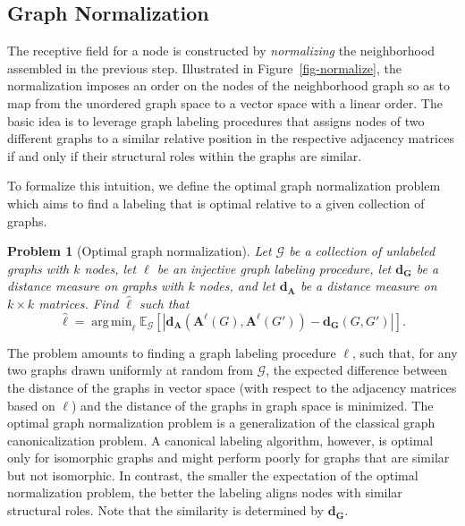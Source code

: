 \documentclass{article}
\DeclareMathOperator*{\argmin}{arg\,min}
\newtheorem{problem}{Problem}
\begin{document}
\subsection{Graph Normalization}

The receptive field for a node is constructed by \emph{normalizing} the neighborhood assembled in the previous step. Illustrated in Figure~\ref{fig-normalize}, the normalization imposes an order on the nodes of the neighborhood graph so as to map from the unordered graph space to a vector space with a linear order. The basic idea is to leverage graph labeling procedures that assigns nodes of two different graphs to a similar relative position in the respective adjacency matrices if and only if their structural roles within the graphs are similar.



To formalize this intuition, we define the optimal graph normalization problem which aims to find a labeling that is optimal relative to a given collection of graphs. 


\begin{problem}[Optimal graph normalization]
Let $\mathcal{G}$ be a collection of unlabeled graphs with $k$ nodes, let $\ell$ be an injective graph labeling procedure, let $\mathbf{d}_{\mathbf{G}}$ be a distance measure on graphs with $k$ nodes, and let $\mathbf{d}_{\mathbf{A}}$ be a distance measure on $k\times k$ matrices. Find $\hat{\ell}$ such that
$$ \label{equation-graph-normalization}
\hat{\ell} = \argmin_{\ell} \mathbb{E}_{\mathcal{G}}\left[\left|\mathbf{d}_{\mathbf{A}}\left(\mathbf{A}^{\ell}(G), \mathbf{A}^{\ell}(G')\right) - \mathbf{d}_{\mathbf{G}}(G, G')\right|\right]. $$
\end{problem}
The problem amounts to finding a graph labeling procedure $\ell$, such that, for any two graphs drawn uniformly at random from $\mathcal{G}$, the expected difference between the distance of the graphs in vector space (with respect to the adjacency matrices based on $\ell$) and the distance of the graphs in graph space is minimized. The optimal graph normalization problem is a generalization of the classical graph canonicalization problem. A canonical labeling algorithm, however, is optimal only for isomorphic graphs and might perform poorly for graphs that are similar but not isomorphic. In contrast, the smaller the expectation of the optimal normalization problem, the better the labeling aligns nodes with similar structural roles. Note that the similarity is determined by $\mathbf{d}_{\mathbf{G}}$.
\end{document}
